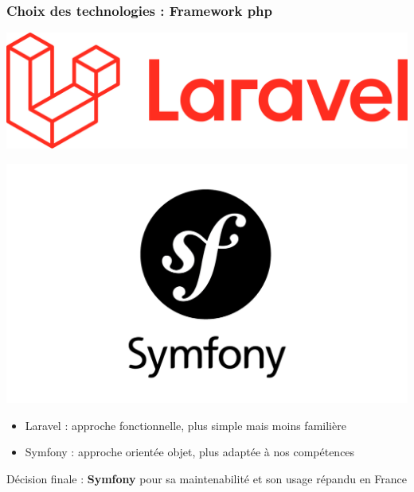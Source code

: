 \begin{frame}
    \frametitle{Choix des technologies : Framework php}

    \begin{minipage}{0.48\textwidth}
        \centering
        \includegraphics[width=\linewidth]{pictures/laravel.png}
    \end{minipage}
    \hfill
    \begin{minipage}{0.48\textwidth}
        \centering
        \includegraphics[width=\linewidth]{pictures/symfony.png}
    \end{minipage}

    \bigskip
    \centering
    \begin{itemize}
	    \centering
	\item Laravel : approche fonctionnelle, plus simple mais moins familière
	\item Symfony : approche orientée objet, plus adaptée à nos compétences
    \end{itemize}

    Décision finale : \textbf{Symfony} pour sa maintenabilité et son usage répandu en France

\end{frame}

